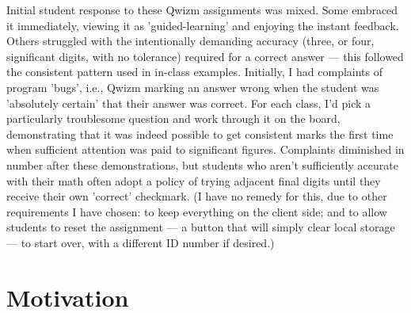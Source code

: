 \documentclass{tufte-handout}
\begin{document}
Initial student response to these Qwizm assignments was mixed. Some embraced it immediately, viewing it as 'guided-learning' and enjoying the instant feedback. Others struggled with the intentionally demanding accuracy (three, or four, significant digits, with no tolerance) required for a correct answer --- this followed the consistent pattern used in in-class examples. Initially, I had complaints of program 'bugs', i.e., Qwizm marking an answer wrong when the student was 'absolutely certain' that their answer was correct. For each class, I'd pick a particularly troublesome question and work through it on the board, demonstrating that it was indeed possible to get consistent \textcolor{Green4}{\Large\checkmark} marks the first time when sufficient attention was paid to significant figures.
\parm
Complaints diminished in number after these demonstrations, but students who aren't sufficiently accurate with their math often adopt a policy of trying adjacent final digits until they receive their own 'correct' checkmark.
\parm
(I have no remedy for this, due to other requirements I have chosen: to keep everything on the client side; and to allow students to reset the assignment --- a button that will simply clear local storage --- to start over, with a different ID number if desired.)

\section{Motivation}\label{sec:motivation}
\end{document}
